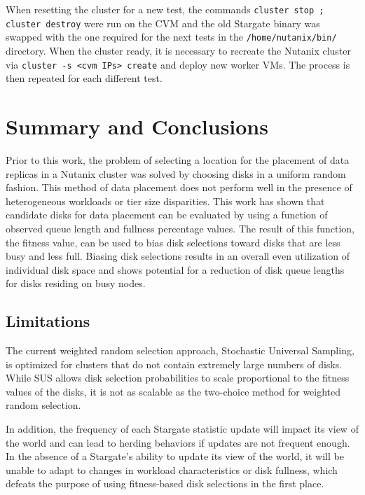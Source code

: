 \documentclass[12pt]{article}
\begin{document}
  When resetting the cluster for a new test, the commands \texttt{cluster stop
  ; cluster destroy} were run on the CVM and the old Stargate binary was
  swapped with the one required for the next tests in the
  \texttt{/home/nutanix/bin/} directory.  When the cluster ready, it is necessary to
  recreate the Nutanix cluster via \texttt{cluster -s <cvm IPs> create} and
  deploy new worker VMs. The process is then repeated for each different test.

\newpage
\FloatBarrier
\section{Summary and Conclusions}

  Prior to this work, the problem of selecting a location for the placement of
  data replicas in a Nutanix cluster was solved by choosing disks in a uniform
  random fashion. This method of data placement does not perform well in the
  presence of heterogeneous workloads or tier size disparities. This work has
  shown that candidate disks for data placement can be evaluated by using a
  function of observed queue length and fullness percentage values. The result
  of this function, the fitness value, can be used to bias disk selections toward
  disks that are less busy and less full. Biasing disk selections results in
  an overall even utilization of individual disk space and shows potential for
  a reduction of disk queue lengths for disks residing on busy nodes.

  \subsection{Limitations}

  The current weighted random selection approach, Stochastic Universal
  Sampling, is optimized for clusters that do not contain extremely large
  numbers of disks. While SUS allows disk selection probabilities to scale
  proportional to the fitness values of the disks, it is not as scalable as the
  two-choice method for weighted random selection.

  In addition, the frequency of each Stargate statistic update will impact its view
  of the world and can lead to herding behaviors if updates are not frequent
  enough. In the absence of a Stargate's ability to update its view of the
  world, it will be unable to adapt to changes in workload characteristics or
  disk fullness, which defeats the purpose of using fitness-based disk
  selections in the first place.
\end{document}
